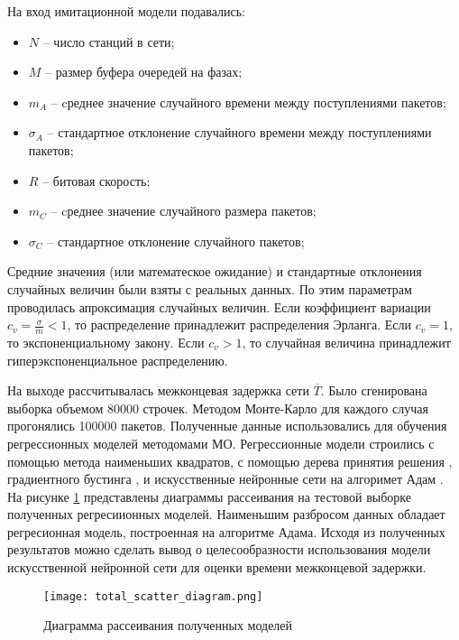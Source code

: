 На вход имитационной модели подавались:
\begin{itemize}
    \item $N$ -- число станций в сети;
    \item $M$ -- размер буфера очередей на фазах;
    \item $m_A$ -- cреднее значение случайного времени между поступлениями пакетов;
    \item $\sigma_A$ -- стандартное отклонение случайного времени между поступлениями пакетов;
    \item $R$ -- битовая скорость;
    \item $m_C$ -- cреднее значение случайного размера пакетов;
    \item $\sigma_C$ -- стандартное отклонение случайного пакетов;
\end{itemize}

Средние значения (или математеское ожидание) и стандартные отклонения случайных величин были взяты с реальных данных. По этим параметрам проводилась апроксимация случайных величин. Если коэффициент вариации $c_v = \frac{\sigma}{m} < 1$, то распределение принадлежит распределения Эрланга. Если $c_v =1$, то экспоненциальному закону. Если $c_v > 1$, то случайная величина принадлежит гиперэкспоненциальное распределению. 

На выходе рассчитывалась межконцевая задержка сети $\overline{T}$. Было сгенирована выборка объемом 80000 строчек. Методом Монте-Карло для каждого случая прогонялись 100000 пакетов. Полученные данные использовались для обучения регрессионных моделей методомами МО. Регрессионные модели строились с помощью метода наименьших квадратов, с помощью дерева принятия решения \cite{Gordon1984}, градиентного бустинга \cite{Friedman2002}, и искусственные нейронные сети на алгоримет Адам \cite{Kingma2015}. На рисунке \cref{fig:total_scatter_diagram} представлены диаграммы рассеивания на тестовой выборке полученных регресиионных моделей. Наименьшим разбросом данных обладает регресионная модель, построенная на алгоритме Адама. Исходя из полученных результатов можно сделать вывод о целесообразности использования модели искусственной нейронной сети для оценки времени межконцевой задержки.


\begin{figure}[h!]
    \centering
     \texttt{[image: total\_scatter\_diagram.png]}
  \caption{Диаграмма рассеивания полученных моделей}
  \label{fig:total_scatter_diagram}
\end{figure}

